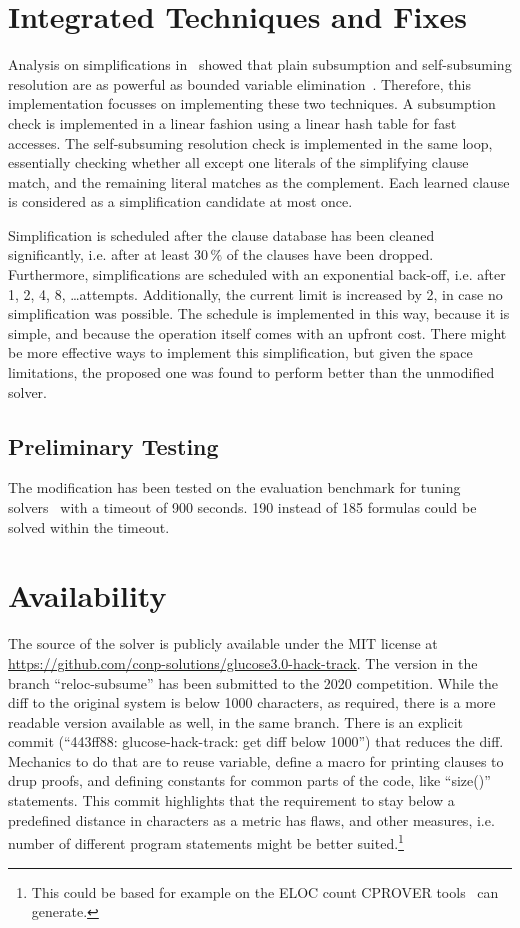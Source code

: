 \documentclass[conference]{IEEEtran}
\begin{document}
\section{Integrated Techniques and Fixes}

Analysis on simplifications in~\cite{M2014} showed that plain subsumption and self-subsuming resolution are as powerful as bounded variable elimination~\cite{EenB:2005}.
Therefore, this implementation focusses on implementing these two techniques.
A subsumption check is implemented in a linear fashion using a linear hash table for fast accesses.
The self-subsuming resolution check is implemented in the same loop, essentially checking whether all except one literals of the simplifying clause match, and the remaining literal matches as the complement.
Each learned clause is considered as a simplification candidate at most once.

Simplification is scheduled after the clause database has been cleaned significantly, i.e. after at least $30\,\%$ of the clauses have been dropped.
Furthermore, simplifications are scheduled with an exponential back-off, i.e. after 1, 2, 4, 8, \dots attempts.
Additionally, the current limit is increased by 2, in case no simplification was possible.
The schedule is implemented in this way, because it is simple, and because the operation itself comes with an upfront cost.
There might be more effective ways to implement this simplification, but given the space limitations, the proposed one was found to perform better than the unmodified solver.

\subsection{Preliminary Testing}

The modification has been tested on the evaluation benchmark for tuning solvers~\cite{DBLP:conf/lion/HoosKSS13} with a timeout of 900 seconds.
190 instead of 185 formulas could be solved within the timeout.

\section{Availability}

The source of the solver is publicly available under the MIT license at \url{https://github.com/conp-solutions/glucose3.0-hack-track}.
The version in the branch ``reloc-subsume'' has been submitted to the 2020 competition.
While the diff to the original system is below 1000 characters, as required, there is a more readable version available as well, in the same branch.
There is an explicit commit (``443ff88: glucose-hack-track: get diff below 1000'') that reduces the diff.
Mechanics to do that are to reuse variable, define a macro for printing clauses to drup proofs, and defining constants for common parts of the code, like ``size()'' statements.
This commit highlights that the requirement to stay below a predefined distance in characters as a metric has flaws, and other measures, i.e. number of different program statements might be better suited.\footnote{This could be based for example on the ELOC count CPROVER tools~\cite{cbmc} can generate.}



\end{document}
